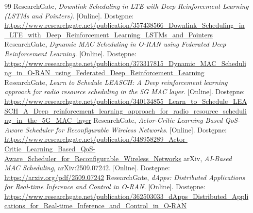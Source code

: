 \documentclass[12pt, a4paper]{article}
\begin{document}
\begin{thebibliography}{99}
 ResearchGate, \textit{Downlink Scheduling in LTE with Deep Reinforcement Learning (LSTMs and Pointers)}. [Online]. Dostępne: \url{https://www.researchgate.net/publication/357438566_Downlink_Scheduling_in_LTE_with_Deep_Reinforcement_Learning_LSTMs_and_Pointers}
 ResearchGate, \textit{Dynamic MAC Scheduling in O-RAN using Federated Deep Reinforcement Learning}. [Online]. Dostępne: \url{https://www.researchgate.net/publication/373317815_Dynamic_MAC_Scheduling_in_O-RAN_using_Federated_Deep_Reinforcement_Learning}
 ResearchGate, \textit{Learn to Schedule LEASCH: A Deep reinforcement learning approach for radio resource scheduling in the 5G MAC layer}. [Online]. Dostępne: \url{https://www.researchgate.net/publication/340134855_Learn_to_Schedule_LEASCH_A_Deep_reinforcement_learning_approach_for_radio_resource_scheduling_in_the_5G_MAC_layer}
 ResearchGate, \textit{Actor-Critic Learning Based QoS-Aware Scheduler for Reconfigurable Wireless Networks}. [Online]. Dostępne: \url{https://www.researchgate.net/publication/348958289_Actor-Critic_Learning_Based_QoS-Aware_Scheduler_for_Reconfigurable_Wireless_Networks}
 arXiv, \textit{AI-Based MAC Scheduling}, arXiv:2509.07242. [Online]. Dostępne: \url{https://arxiv.org/pdf/2509.07242}
 ResearchGate, \textit{dApps: Distributed Applications for Real-time Inference and Control in O-RAN}. [Online]. Dostępne: \url{https://www.researchgate.net/publication/362503033_dApps_Distributed_Applications_for_Real-time_Inference_and_Control_in_O-RAN}

\end{thebibliography}
\end{document}
